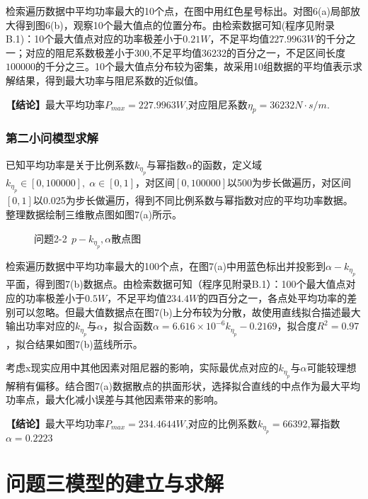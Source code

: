 \documentclass{article}
\numberwithin{equation}{subsection}
\begin{document}
检索遍历数据中平均功率最大的10个点，在图中用红色星号标出。对图6(a)局部放大得到图6(b)，观察10个最大值点的位置分布。由检索数据可知(程序见附录B.1)：10个最大值点对应的功率极差小于$0.21W$，不足平均值$227.9963W$的千分之一；对应的阻尼系数极差小于$300$,不足平均值$36232$的百分之一，不足区间长度$100000$的千分之三。10个最大值点分布较为密集，故采用10组数据的平均值表示求解结果，得到最大功率与阻尼系数的近似值。

\textbf{【结论】}最大平均功率$P_{max}=227.9963W$,对应阻尼系数$\eta _p =36232N·s/m$.


\subsubsection{第二小问模型求解}
已知平均功率是关于比例系数$k_{\eta _{p}}$与幂指数$\alpha$的函数，定义域$k_{\eta _p}\in [0,100000],\;\alpha\in[0,1]$，对区间$[0,100000]$以500为步长做遍历，对区间$[0,1]$以0.025为步长做遍历，得到不同比例系数与幂指数对应的平均功率数据。整理数据绘制三维散点图如图7(a)所示。

\begin{figure}[htbp]
    \centering
    \quad
    \caption{问题2-2$\;\,p-k_{\eta _p},\alpha$散点图}
\end{figure}
检索遍历数据中平均功率最大的100个点，在图7(a)中用蓝色标出并投影到$\alpha-k_{\eta _p}$平面，得到图7(b)数据点。由检索数据可知（程序见附录B.1）：100个最大值点对应的功率极差小于$0.5W$，不足平均值$234.4W$的四百分之一，各点处平均功率的差别可以忽略。但最大值数据点在图7(b)上分布较为分散，故使用直线拟合描述最大输出功率对应的$k_{\eta _p}$与$\alpha$，拟合函数$\alpha=6.616\times 10^{-6}k_{\eta_p}-0.2169$，拟合度$R^2=0.97$，拟合结果如图7(b)蓝线所示。

考虑x现实应用中其他因素对阻尼器的影响，实际最优点对应的$k_{\eta_p}$与$\alpha$可能较理想解稍有偏移。结合图7(a)数据散点的拱面形状，选择拟合直线的中点作为最大平均功率点，最大化减小误差与其他因素带来的影响。

\textbf{【结论】}最大平均功率$P_{max}=234.4644W$,对应的比例系数$k_{\eta_p}=66392$,幂指数$\alpha=0.2223$






{\centering\section{问题三模型的建立与求解}}
\end{document}
